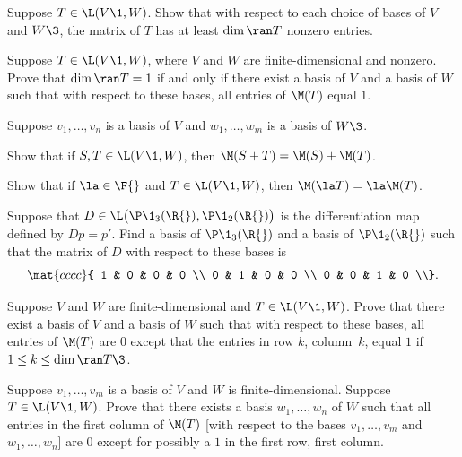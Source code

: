 
\exercise
Suppose $T \in \L(V\1, W)$. Show that with respect to each choice of bases of $V$ and $W\3$, the matrix of $T$ has at least $\dim \ran T$ nonzero entries.


\exercise
Suppose $T \in \L(V\1, W)$, where $V$ and $W$ are finite-dimensional and nonzero. Prove that $\dim \ran T = 1$ if and only if there exist a basis of $V$ and a basis of $W$ such that with respect to these bases, all entries of $\M(T)$ equal $1$.


\exercise
Suppose $v_1, \ldots, v_n$ is a basis of $V$ and $w_1, \ldots, w_m$ is a basis of $W\3$.
\begin{subtheorem}
\item
Show that if $S, T \in \L(V\1, W)$, then $\M(S+T) = \M(S) + \M(T)$.
\item
Show that if $\la \in \F{}$ and $T \in \L(V\1, W)$, then $\M(\la T) = \la \M(T)$.
\end{subtheorem}


\exercise
Suppose that $D \in \L\bigl(\P\1_3(\R{}), \P\1_2(\R{}) \bigr)$ is the differentiation map defined by \mbox{$Dp = p'\!$}. Find a basis of $\P\1_3(\R{})$ and a basis of $\P\1_2(\R{})$ such that the matrix of $D$ with respect to these bases is
\[
\mat{cccc}{
1 & 0 & 0 & 0 \\
0 & 1 & 0 & 0 \\
0 & 0 & 1 & 0 \\}.
\]
\vspace{-.15in}


\exercise
Suppose $V$ and $W$ are finite-dimensional and $T \in \L(V\1, W)$. Prove that there exist a basis of $V$ and a basis of $W$ such that with respect to these bases, all entries of $\M(T)$ are $0$ except that the entries in row $k$, column~$k$, equal $1$ if $1 \le k \le \dim \ran T\3$. \label{zeroonematrix}


\exercise
Suppose $v_1, \dots, v_m$ is a basis of $V$ and $W$ is finite-dimensional. Suppose $T \in \L(V\1, W)$. Prove that there exists a basis $w_1, \dots, w_n$ of $W$ such that all entries in the first column of $\M(T)$ [with respect to the bases $v_1, \dots, v_m$ and $w_1, \dots, w_n$] are $0$ except for possibly a $1$ in the first row, first column.


